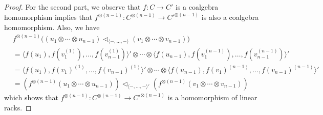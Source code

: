 \documentclass[10pt,a4paper]{amsart}
\begin{document}
\begin{proof}
     For the second part, we observe that $f : C \rightarrow C'$ is a coalgebra homomorphism implies that $f^{\otimes (n-1)} : C^{\otimes (n-1)} \rightarrow C'^{\otimes (n-1)}$ is also a coalgebra homomorphism. Also, we have
     \begin{align*}
        &f^{\otimes (n-1)} \big(    (u_1 \otimes \cdots \otimes u_{n-1}) \triangleleft_{\langle -, \ldots, - \rangle}  (v_1 \otimes \cdots \otimes v_{n-1})\big) \\
        &= \langle  f(u_1), f(v_1^{(1)}), \ldots, f (v_{n-1}^{(1)})    \rangle' \otimes \cdots \otimes \langle  f (u_{n-1}), f (v_1^{(n-1)}), \ldots, f (v_{n-1}^{(n-1)}) \rangle' \\
        &= \langle  f(u_1), f(v_1)^{(1)}, \ldots, f (v_{n-1})^{(1)}    \rangle' \otimes \cdots \otimes \langle  f (u_{n-1}), f (v_1)^{(n-1)}, \ldots, f (v_{n-1})^{(n-1)} \rangle' \\
        &= (f^{\otimes (n-1)} (u_1 \otimes \cdots \otimes u_{n-1})) \triangleleft_{\langle -, \ldots, - \rangle'} (f^{\otimes (n-1)} (v_1 \otimes \cdots \otimes v_{n-1}))
     \end{align*}
     which shows that $f^{\otimes (n-1)} : C^{\otimes (n-1)} \rightarrow C'^{\otimes (n-1)}$ is a homomorphism of linear racks.
\end{proof}
\end{document}
